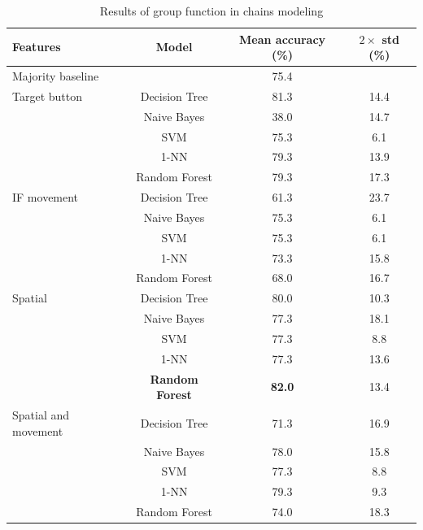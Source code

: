 \begin{table}[!htbp]
 \centering
\begin{tabular}{lccc}
\toprule
Features & Model    & Mean accuracy (\%) & $2\times$ std (\%) \\
\midrule
Majority baseline &   & 75.4	& \\
\midrule
Target button 	& Decision Tree 	& 81.3		& 14.4 	\\
				& Naive Bayes  	& 38.0		& 14.7	\\
				& SVM 			& 75.3		& 6.1 	\\
				& 1-NN			& 79.3		& 13.9 	\\
				& Random Forest	& 79.3		& 17.3	\\
\midrule
IF movement	& Decision Tree 	& 	61.3	& 23.7 \\
			& Naive Bayes  	&	75.3	& 6.1	\\
			& SVM 			&	75.3	& 6.1 	\\
			& 1-NN			&	73.3	 & 15.8 	\\
			& Random Forest	&	68.0	& 16.7 	\\
\midrule
Spatial	 	& Decision Tree 	& 80.0	& 10.3 \\
			& Naive Bayes  	& 77.3 	& 18.1	\\
			& SVM 			& 77.3	& 8.8 	\\
			& 1-NN			& 77.3	& 13.6 \\
			& \textbf{Random Forest}	& \textbf{82.0}	& 13.4 \\	

\midrule
Spatial and movement& Decision Tree 	& 71.3	& 16.9 \\
					& Naive Bayes  	& 78.0	& 15.8	\\
					& SVM 			& 77.3	& 8.8 	\\
					& 1-NN			& 79.3	& 9.3 \\
					& Random Forest	& 74.0	& 18.3 \\	 	
\bottomrule
\end{tabular}
\caption{Results of group function in chains modeling}
\label{tab:chains-ml-group}
\end{table}

